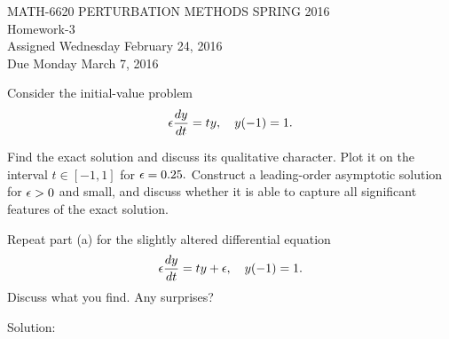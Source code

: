 


\begin{center}
\large{ MATH-6620 \hspace{1in}  PERTURBATION METHODS \hspace{1in}SPRING 2016\\ Homework-3 \\ Assigned Wednesday February 24, 2016 \\ Due Monday March 7, 2016}\end{center}




 \ec

\benum


\item Consider the initial-value problem
\begin{equation*}
\epsilon \frac{dy}{dt} = ty, \quad y(-1) = 1.
\end{equation*}
\benum
\item Find the exact solution and discuss its qualitative character.  Plot it on the interval $t \in [-1,1]$ for $\epsilon = 0.25.$
Construct a leading-order asymptotic solution for $\epsilon>0$ and small, and discuss whether it is able to capture all significant features of the exact solution.
\item Repeat part (a) for the slightly altered differential equation
\begin{equation*}
\epsilon \frac{dy}{dt} = ty+\epsilon, \quad y(-1) = 1.
\end{equation*}
Discuss what you find.  Any surprises?
\eenum

Solution:\\

